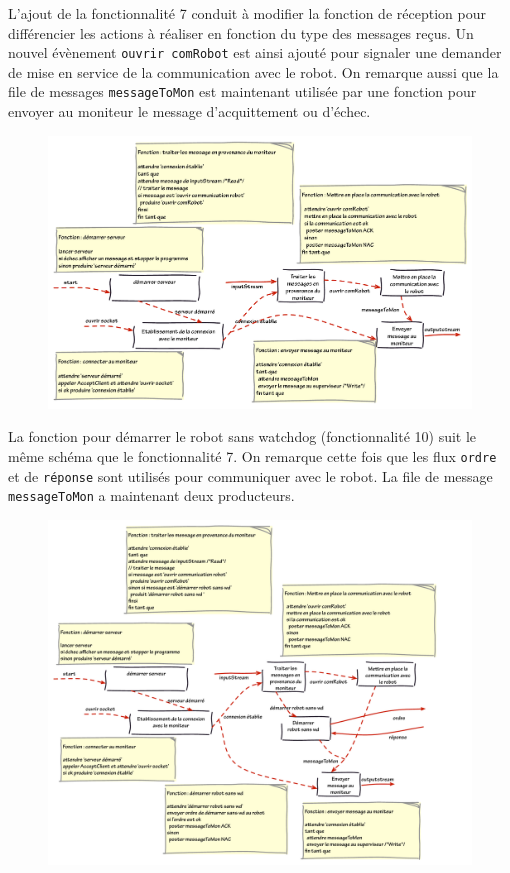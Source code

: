 \documentclass[11pt,a4paper]{paper}
\begin{document}
L'ajout de la fonctionnalité 7 conduit à modifier la fonction de réception pour différencier les actions à réaliser en fonction du type des messages reçus. Un nouvel évènement {\tt ouvrir comRobot} est ainsi ajouté pour signaler une demander de mise en service de la communication avec le robot. On remarque aussi que la file de messages {\tt messageToMon} est maintenant utilisée par une fonction pour envoyer au moniteur le message d'acquittement ou d'échec.
 \begin{figure}[htbp]
\begin{center}
\includegraphics[scale=0.5]{figures_pdf/fonc/fonc7}
\end{center}
\end{figure}
\FloatBarrier

La fonction pour démarrer le robot sans watchdog (fonctionnalité 10) suit le même schéma que le fonctionnalité 7. On remarque cette fois que les flux {\tt ordre} et de {\tt réponse} sont utilisés pour communiquer avec le robot. La file de message {\tt messageToMon} a maintenant deux producteurs.
 \begin{figure}[htbp]
\begin{center}
\includegraphics[scale=0.5]{figures_pdf/fonc/fonc10}
\end{center}
\end{figure}
\FloatBarrier
\end{document}
